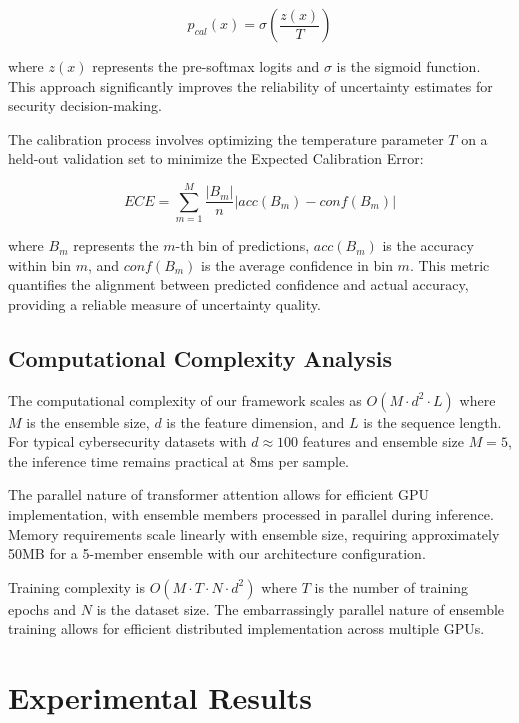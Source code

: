 \documentclass[journal]{IEEEtran}
\begin{document}
\begin{equation}
p_{cal}(x) = \sigma(\frac{z(x)}{T})
\end{equation}

where $z(x)$ represents the pre-softmax logits and $\sigma$ is the sigmoid function. This approach significantly improves the reliability of uncertainty estimates for security decision-making.

The calibration process involves optimizing the temperature parameter $T$ on a held-out validation set to minimize the Expected Calibration Error:

\begin{equation}
ECE = \sum_{m=1}^M \frac{|B_m|}{n} |acc(B_m) - conf(B_m)|
\end{equation}

where $B_m$ represents the $m$-th bin of predictions, $acc(B_m)$ is the accuracy within bin $m$, and $conf(B_m)$ is the average confidence in bin $m$. This metric quantifies the alignment between predicted confidence and actual accuracy, providing a reliable measure of uncertainty quality.

\subsection{Computational Complexity Analysis}

The computational complexity of our framework scales as $O(M \cdot d^2 \cdot L)$ where $M$ is the ensemble size, $d$ is the feature dimension, and $L$ is the sequence length. For typical cybersecurity datasets with $d \approx 100$ features and ensemble size $M=5$, the inference time remains practical at 8ms per sample.

The parallel nature of transformer attention allows for efficient GPU implementation, with ensemble members processed in parallel during inference. Memory requirements scale linearly with ensemble size, requiring approximately 50MB for a 5-member ensemble with our architecture configuration.

Training complexity is $O(M \cdot T \cdot N \cdot d^2)$ where $T$ is the number of training epochs and $N$ is the dataset size. The embarrassingly parallel nature of ensemble training allows for efficient distributed implementation across multiple GPUs.

\section{Experimental Results}
\end{document}
